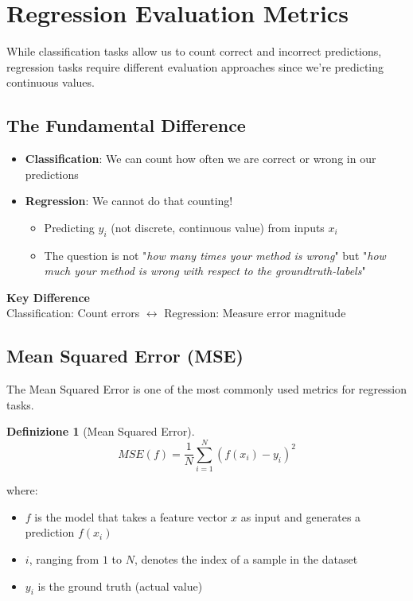 \documentclass[11pt,a4paper]{article}
\theoremstyle{definition}
\newtheorem{definition}{Definizione}[section]
\theoremstyle{plain}
\theoremstyle{remark}
\begin{document}
\section{Regression Evaluation Metrics}

While classification tasks allow us to count correct and incorrect predictions, regression tasks require different evaluation approaches since we're predicting continuous values.

\subsection{The Fundamental Difference}

\begin{itemize}
    \item \textbf{Classification}: We can count how often we are correct or wrong in our predictions
    \item \textbf{Regression}: We cannot do that counting!
    \begin{itemize}
        \item Predicting $y_i$ (not discrete, continuous value) from inputs $x_i$
        \item The question is not "\textit{how many times your method is wrong}" but "\textit{how much your method is wrong with respect to the groundtruth-labels}"
    \end{itemize}
\end{itemize}

\begin{center}
\colorbox{purple!15}{\parbox{0.9\textwidth}{
\centering
\textbf{Key Difference}\\[0.2cm]
Classification: Count errors $\leftrightarrow$ Regression: Measure error magnitude
}}
\end{center}

\subsection{Mean Squared Error (MSE)}

The Mean Squared Error is one of the most commonly used metrics for regression tasks.

\begin{definition}[Mean Squared Error]
\begin{equation}
MSE(f) = \frac{1}{N} \sum_{i=1}^{N} (f(x_i) - y_i)^2
\end{equation}

where:
\begin{itemize}
    \item $f$ is the model that takes a feature vector $x$ as input and generates a prediction $f(x_i)$
    \item $i$, ranging from $1$ to $N$, denotes the index of a sample in the dataset
    \item $y_i$ is the ground truth (actual value)
\end{itemize}
\end{definition}
\end{document}
